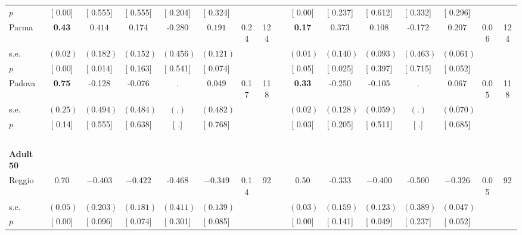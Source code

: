 \begin{longtable}{L{8em} c c c c c c c p{1em} c c c c c c c}
\quad \quad \quad \quad $ p$ & [     0.00] & [    0.555] & [    0.555] & [    0.204] & [    0.324] & & & & [     0.00] & [    0.237] & [    0.612] & [    0.332] & [    0.296] & &  \\[1em]
\quad \quad \quad Parma& \textbf{     0.43} & $ \mathbf{    0.414}$ &     0.174 &    -0.280 & $ \mathbf{    0.191}$ &      0.24 &       124 & & \textbf{     0.17} & $ \mathbf{    0.373}$ &     0.108 &    -0.172 & $ \mathbf{    0.207}$ &      0.06 &       124  \\*
\quad \quad \quad \quad s.e.& $ (     0.02)$ & $ (    0.182)$ & $ (    0.152)$ & $ (    0.456)$ & $ (    0.121)$ & & & & $ (     0.01)$ & $ (    0.140)$ & $ (    0.093)$ & $ (    0.463)$ & $ (    0.061)$ & &  \\*
\quad \quad \quad \quad $ p$ & [     0.00] & [    0.014] & [    0.163] & [    0.541] & [    0.074] & & & & [     0.05] & [    0.025] & [    0.397] & [    0.715] & [    0.052] & &  \\[1em]
\quad \quad \quad Padova& \textbf{     0.75} &    -0.128 &    -0.076 &         . &     0.049 &      0.17 &       118 & & \textbf{     0.33} &    -0.250 &    -0.105 &         . &     0.067 &      0.05 &       118  \\*
\quad \quad \quad \quad s.e.& $ (     0.25)$ & $ (    0.494)$ & $ (    0.484)$ & $ (        .)$ & $ (    0.482)$ & & & & $ (     0.02)$ & $ (    0.128)$ & $ (    0.059)$ & $ (        .)$ & $ (    0.070)$ & &  \\*
\quad \quad \quad \quad $ p$ & [     0.14] & [    0.555] & [    0.638] & [        .] & [    0.768] & & & & [     0.03] & [    0.205] & [    0.511] & [        .] & [    0.685] & &  \\[1em]
~\\[1em]
\quad \quad \textbf{Adult 50} & & & & & & & & & & & & & & & \\* 
\quad \quad \quad Reggio& 0.70 & $ \mathbf{   -0.403}$ & $ \mathbf{   -0.422}$ &    -0.468 & $ \mathbf{   -0.349}$ &      0.14 &        92 & & 0.50 &    -0.333 & $ \mathbf{   -0.400}$ &    -0.500 & $ \mathbf{   -0.326}$ &      0.05 &        92  \\*
\quad \quad \quad \quad s.e.& $ (     0.05)$ & $ (    0.203)$ & $ (    0.181)$ & $ (    0.411)$ & $ (    0.139)$ & & & & $ (     0.03)$ & $ (    0.159)$ & $ (    0.123)$ & $ (    0.389)$ & $ (    0.047)$ & &  \\*
\quad \quad \quad \quad $ p$ & [     0.00] & [    0.096] & [    0.074] & [    0.301] & [    0.085] & & & & [     0.00] & [    0.141] & [    0.049] & [    0.237] & [    0.052] & &  \\[1em]

\end{longtable}
